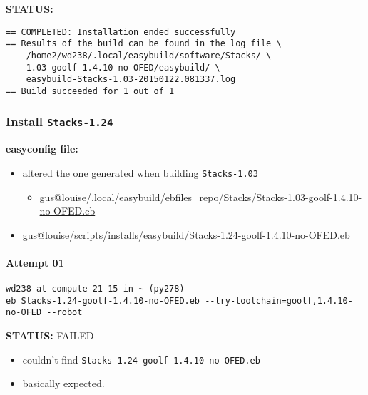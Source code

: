 \documentclass[letterpaper]{scrartcl}
\begin{document}
\textbf{STATUS:}

\begin{verbatim}
== COMPLETED: Installation ended successfully
== Results of the build can be found in the log file \
    /home2/wd238/.local/easybuild/software/Stacks/ \
    1.03-goolf-1.4.10-no-OFED/easybuild/ \
    easybuild-Stacks-1.03-20150122.081337.log
== Build succeeded for 1 out of 1
\end{verbatim}

\subsubsection{Install \texttt{Stacks-1.24}}\label{install-stacks-1.24}

\textbf{easyconfig file:}

\begin{itemize}
\itemsep1pt\parskip0pt
\item
  altered the one generated when building \texttt{Stacks-1.03}

  \begin{itemize}
  \itemsep1pt\parskip0pt\parsep0pt
  \item
    \href{file:///home/gus/remote_mounts/louise/.local/easybuild/ebfiles_repo/Stacks/Stacks-1.03-goolf-1.4.10-no-OFED.eb}{gus@louise/.local/easybuild/ebfiles\_repo/Stacks/Stacks-1.03-goolf-1.4.10-no-OFED.eb}
  \end{itemize}
\item
  \href{file:///home/gus/remote_mounts/louise/scripts/installs/easybuild/Stacks-1.24-goolf-1.4.10-no-OFED.eb}{gus@louise/scripts/installs/easybuild/Stacks-1.24-goolf-1.4.10-no-OFED.eb}
\end{itemize}

\paragraph{Attempt 01}\label{attempt-01}

\begin{verbatim}
wd238 at compute-21-15 in ~ (py278)
eb Stacks-1.24-goolf-1.4.10-no-OFED.eb --try-toolchain=goolf,1.4.10-no-OFED --robot
\end{verbatim}

\textbf{STATUS:} FAILED

\begin{itemize}
\itemsep1pt\parskip0pt
\item
  couldn't find \texttt{Stacks-1.24-goolf-1.4.10-no-OFED.eb}
\item
  basically expected.
\end{itemize}
\end{document}
